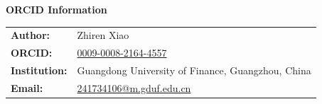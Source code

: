 \documentclass[12pt]{article}
\begin{document}
\begin{center}
{\large \textbf{ORCID Information}}
\end{center}

\vspace{1cm}

\begin{tabular}{ll}
\textbf{Author:} & Zhiren Xiao \\
\textbf{ORCID:} & \href{https://orcid.org/0009-0008-2164-4557}{0009-0008-2164-4557} \\
\textbf{Institution:} & Guangdong University of Finance, Guangzhou, China \\
\textbf{Email:} & \href{mailto:241734106@m.gduf.edu.cn}{241734106@m.gduf.edu.cn}
\end{tabular}
\end{document}
